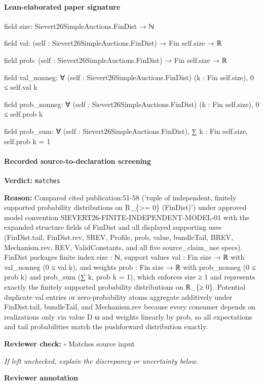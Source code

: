 \documentclass[10pt]{article}
\newcommand{\reviewerbox}{%
  \par\noindent\fbox{\parbox{0.96\linewidth}{\rule{0pt}{0.38in}}}\par
}
\newcommand{\reviewmatch}[1]{%
  \par\noindent\textbf{Reviewer check:} $\square$\; #1\par
  \noindent\emph{If left unchecked, explain the discrepancy or uncertainty below.}\par
}
\begin{document}
\paragraph{Lean-elaborated paper signature}
\begin{ReviewVerbatim}
field size:
Sievert26SimpleAuctions.FinDist → ℕ

field val:
(self : Sievert26SimpleAuctions.FinDist) → Fin self.size → ℝ

field prob:
(self : Sievert26SimpleAuctions.FinDist) → Fin self.size → ℝ

field val_nonneg:
∀ (self : Sievert26SimpleAuctions.FinDist) (k : Fin self.size), 0 ≤ self.val k

field prob_nonneg:
∀ (self : Sievert26SimpleAuctions.FinDist) (k : Fin self.size), 0 ≤ self.prob k

field prob_sum:
∀ (self : Sievert26SimpleAuctions.FinDist), ∑ k : Fin self.size, self.prob k = 1
\end{ReviewVerbatim}


\paragraph{Recorded source-to-declaration screening}
\textbf{Verdict:} \texttt{matches}
\\
{\raggedright
\textbf{Reason:} Compared cited publication:\allowbreak{}51-\allowbreak{}58 ('tuple of independent, finitely supported probability distributions on R\_\allowbreak{}\{>= 0\} (FinDist)') under approved model convention SIEVERT26-\allowbreak{}FINITE-\allowbreak{}INDEPENDENT-\allowbreak{}MODEL-\allowbreak{}01 with the expanded structure fields of FinDist and all displayed supporting uses (FinDist.\allowbreak{}tail, FinDist.\allowbreak{}rev, SREV, Profile, prob, value, bundleTail, BREV, Mechanism.\allowbreak{}rev, REV, ValidConstants, and all five source\_\allowbreak{}claim\_\allowbreak{}use specs).\allowbreak{} FinDist packages finite index size :\allowbreak{} ℕ, support values val :\allowbreak{} Fin size → ℝ with val\_\allowbreak{}nonneg (0 ≤ val k), and weights prob :\allowbreak{} Fin size → ℝ with prob\_\allowbreak{}nonneg (0 ≤ prob k) and prob\_\allowbreak{}sum (∑ k, prob k = 1), which enforces size ≥ 1 and represents exactly the finitely supported probability distributions on ℝ\_\allowbreak{}\{≥ 0\}.\allowbreak{} Potential duplicate val entries or zero-\allowbreak{}probability atoms aggregate additively under FinDist.\allowbreak{}tail, bundleTail, and Mechanism.\allowbreak{}rev because every consumer depends on realizations only via value D ω and weights linearly by prob, so all expectations and tail probabilities match the pushforward distribution exactly.\allowbreak{}
\par}
\reviewmatch{Matches source input}
\noindent\textbf{Reviewer annotation}\par
\reviewerbox
\clearpage
\hypertarget{paper-prerequisite-e0c4e0f254386cff}{}
\end{document}
